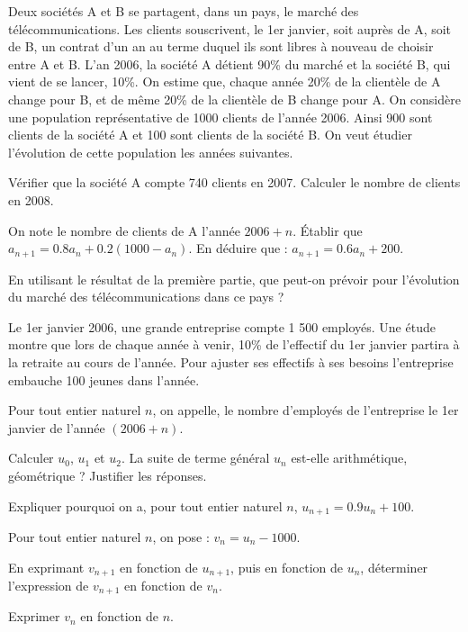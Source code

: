 \documentclass[a4paper,12pt]{scrartcl}
\begin{document}
\partie{}
Deux sociétés A et B se partagent, dans un pays, le marché des télécommunications. Les clients souscrivent, le 1er janvier, soit auprès de A, soit de B, un contrat d'un an au terme duquel ils sont libres à nouveau de choisir entre A et  B. L'an 2006, la société A détient 90\% du marché et la société B, qui vient de se lancer, 10\%.
On estime que, chaque année 20\% de la clientèle de A change pour B, et de même 20\% de la clientèle de B change pour A.
On considère une population représentative de 1000 clients de l'année 2006. Ainsi 900 sont clients de la société A et 100 sont clients de la société B. 
On veut étudier l'évolution de cette population les années suivantes.


\subquestion{}
Vérifier que la société A compte 740 clients en 2007. Calculer le nombre de clients en 2008.

\subquestion{}
On note le nombre de clients de A l'année $2006 + n$.
Établir que $a_{n+1} = 0.8 a_n + 0.2 (1000-a_n)$. En déduire que : $a_{n+1} = 0.6 a_n + 200$.

\question{}
En utilisant le résultat de la première partie, que peut-on prévoir pour l'évolution du marché des télécommunications dans ce pays ?

\probleme[3]{}
Le 1er janvier 2006, une grande entreprise compte 1 500 employés. Une étude montre que lors de chaque année à venir, 10\% de l'effectif du 1er janvier partira à la retraite au cours de l'année. Pour ajuster ses effectifs à ses besoins l'entreprise embauche 100 jeunes dans l'année. 

Pour tout entier naturel $n$, on appelle, le nombre d'employés de l'entreprise le 1er janvier de l'année $( 2006 + n)$.


\subquestion{}
Calculer $u_0$, $u_1$ et $u_2$. La suite de terme général $u_n$ est-elle arithmétique, géométrique ? Justifier les réponses.

\subquestion{}
Expliquer pourquoi on a, pour tout entier naturel $n$, $u_{n+1} = 0.9 u_n + 100$. 

\question{}
Pour tout entier naturel $n$, on pose : $v_n = u_n - 1000$. 

\subquestion{}
En exprimant $v_{n+1}$ en fonction de $u_{n+1}$, puis en fonction de $u_{n}$, déterminer l'expression de $v_{n+1}$ en fonction de $v_{n}$.

\subquestion{}
Exprimer $v_{n}$ en fonction de $n$.
\end{document}
